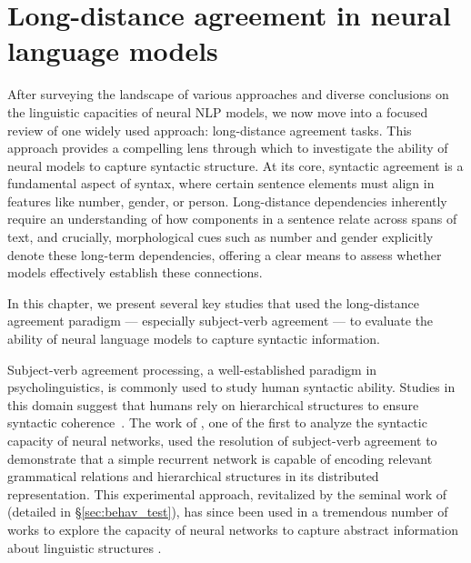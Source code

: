 \chapter{Long-distance agreement in neural language models}\label{chp:NA_tasks}



After surveying the landscape of various approaches and diverse conclusions on the linguistic capacities of neural NLP models, we now move into a focused review of one widely used approach: long-distance agreement tasks. This approach provides a compelling lens through which to investigate the ability of neural models to capture syntactic structure. At its core, syntactic agreement is a fundamental aspect of syntax,  where certain sentence elements must align in features like number, gender, or person. Long-distance dependencies inherently require an understanding of how components in a sentence relate across spans of text, and crucially, morphological cues
such as number and gender explicitly denote these long-term dependencies, offering a clear means to assess whether models effectively establish these connections.
 
In this chapter, we present several key studies that used the long-distance agreement paradigm --- especially subject-verb agreement --- to evaluate the ability of neural language models to capture syntactic information. 


Subject-verb agreement processing, a well-established paradigm in psycholinguistics, is commonly used to study human syntactic ability. Studies in this domain suggest that humans rely on hierarchical structures to ensure syntactic coherence~\citep{bockRegulatingMentalEnergy1992, BOCK199145, bockAttractionsVerbAgreement2001}. The work of \cite{elman89representation}, one of the first to analyze the syntactic capacity of neural networks, used the resolution of subject-verb agreement to demonstrate that a simple recurrent network is capable of encoding relevant grammatical relations and hierarchical structures in its distributed representation. This experimental approach, revitalized by the seminal work of \cite{linzen-etal-2016-assessing} (detailed in \S\ref{sec:behav_test}), has since been used in a tremendous number of works to explore the capacity of neural networks to capture abstract information about linguistic structures . 


